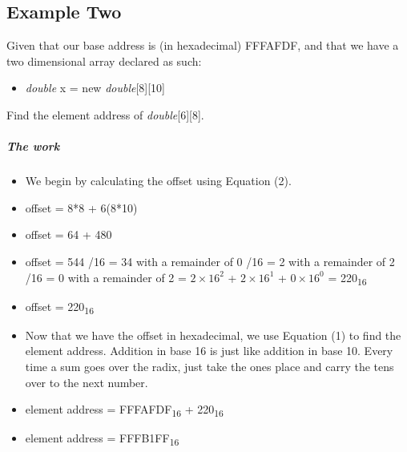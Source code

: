 \documentclass[12pt]{article}
\begin{document}
\subsection{Example Two}
Given that our base address is (in hexadecimal) FFFAFDF, and that we have a two dimensional array declared as such:
\begin{itemize}[leftmargin=1.5em]
\item[] \textit{double} x = new \textit{double}[8][10]
\end{itemize}
Find the element address of \textit{double}[6][8].
\subparagraph{The work}
\begin{itemize}[leftmargin=1.5em]
\item[] We begin by calculating the offset using Equation (2).
\item[] offset = 8*8 + 6(8*10)
\item[] offset = 64 + 480
\item[] offset = 544
/16 = 34 with a remainder of 0
/16 = 2 with a remainder of 2
/16 = 0 with a remainder of 2
 = $2\times16^2$ + $2\times16^1$ + $0\times16^0$
 = 220\textsubscript{16}
\item[] offset = 220\textsubscript{16}
\item[] Now that we have the offset in hexadecimal, we use Equation (1) to find the element address. Addition in base 16 is just like addition in base 10. Every time a sum goes over the radix, just take the ones place and carry the tens over to the next number.
\item[] element address = FFFAFDF\textsubscript{16} + 220\textsubscript{16}
\item[] element address = FFFB1FF\textsubscript{16}
\end{itemize}
\end{document}
